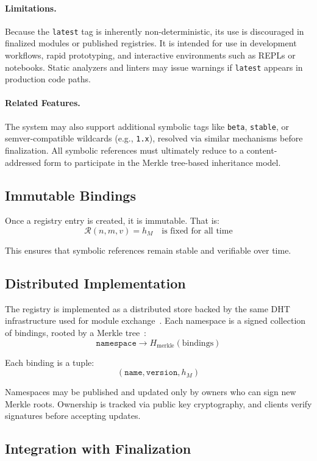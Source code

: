 \documentclass[sigplan,screen]{acmart}
\begin{document}
\paragraph{Limitations.}
Because the \texttt{latest} tag is inherently non-deterministic, its use is discouraged in finalized modules or published registries. It is intended for use in development workflows, rapid prototyping, and interactive environments such as REPLs or notebooks. Static analyzers and linters may issue warnings if \texttt{latest} appears in production code paths.

\paragraph{Related Features.}
The system may also support additional symbolic tags like \texttt{beta}, \texttt{stable}, or semver-compatible wildcards (e.g., \texttt{1.x}), resolved via similar mechanisms before finalization. All symbolic references must ultimately reduce to a content-addressed form to participate in the Merkle tree-based inheritance model.

\subsection{Immutable Bindings}

Once a registry entry is created, it is immutable. That is:
\[
	\mathcal{R}(n, m, v) = h_M \quad \text{is fixed for all time}
\]

This ensures that symbolic references remain stable and verifiable over time.

\subsection{Distributed Implementation}

The registry is implemented as a distributed store backed by the same DHT infrastructure used for module exchange~\cite{dht}. Each namespace is a signed collection of bindings, rooted by a Merkle tree~\cite{merkle1978}:
\[
	\texttt{namespace} \rightarrow H_{\text{merkle}}(\text{bindings})
\]

Each binding is a tuple:
\[
	(\texttt{name}, \texttt{version}, h_M)
\]

Namespaces may be published and updated only by owners who can sign new Merkle roots. Ownership is tracked via public key cryptography, and clients verify signatures before accepting updates.

\subsection{Integration with Finalization}
\end{document}
